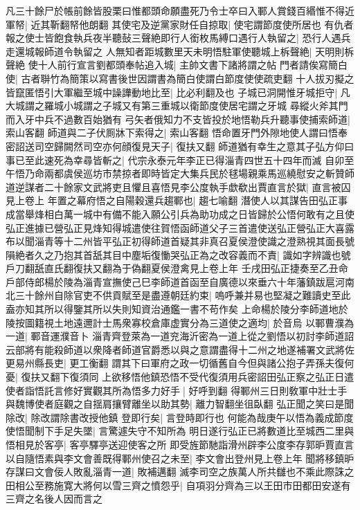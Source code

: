 凡三十餘尸於帳前餘皆股栗曰惟都頭命願盡死乃令士卒曰入鄆人賞錢百緡惟不得近軍帑|{
	近其靳翻帑他朗翻}
其使宅及逆黨家財任自掠取|{
	使宅謂節度使所居也}
有仇者報之使士皆飽食執兵夜半聽鼔三聲絶即行人銜枚馬縛口遇行人執留之|{
	恐行人遇兵走還城報師道令執留之}
人無知者距城數里天未明悟駐軍使聽城上柝聲絶|{
	天明則柝聲絶}
使十人前行宣言劉都頭奉帖追入城|{
	主帥文書下諸將謂之帖}
門者請俟寫簡白使|{
	古者聨竹為簡策以寫書後世因謂書為簡白使謂白節度使使疏吏翻}
十人拔刃擬之皆竄匿悟引大軍繼至城中譟譁動地比至|{
	比必利翻及也}
子城已洞開惟牙城拒守|{
	凡大城謂之羅城小城謂之子城又有第三重城以衛節度使居宅謂之牙城}
尋縱火斧其門而入牙中兵不過數百始猶有弓矢者俄知力不支皆投於地悟勒兵升聽事使捕索師道|{
	索山客翻}
師道與二子伏厠牀下索得之|{
	索山客翻}
悟命置牙門外隙地使人謂曰悟奉密詔送司空歸闕然司空亦何顔復見天子|{
	復扶又翻}
師道猶有幸生之意其子弘方仰曰事已至此速死為幸尋皆斬之|{
	代宗永泰元年李正已得淄青四世五十四年而滅}
自卯至午悟乃命兩都虞侯巡坊市禁掠者即時皆定大集兵民於毬場親乘馬巡繞慰安之斬贊師道逆謀者二十餘家文武將吏且懼且喜悟見李公度執手歔欷出賈直言於獄|{
	直言被囚見上卷上}
年置之幕府悟之自陽穀還兵趨鄆也|{
	趨七喻翻}
潛使人以其謀告田弘正事成當舉烽相白萬一城中有備不能入願公引兵為助功成之日皆歸於公悟何敢有之且使弘正進據已營弘正見烽知得城遣使往賀悟函師道父子三首遣使送弘正營弘正大喜露布以聞淄青等十二州皆平弘正初得師道首疑其非真召夏侯澄使識之澄熟視其面長號隕絶者久之乃抱其首舐其目中塵垢復慟哭弘正為之改容義而不責|{
	識如字辨識也號戶刀翻舐直氏翻復扶又翻為于偽翻夏侯澄禽見上卷上年}
壬戌田弘正捷奏至乙丑命戶部侍郎楊於陵為淄青宣撫使己巳李師道首函至自廣德以來垂六十年藩鎮跋扈河南北三十餘州自除官吏不供貢賦至是盡遵朝廷約束|{
	嗚呼兼并易也堅凝之難讀史至此盍亦知其所以得鑒其所以失則知資治通鑑一書不苟作矣}
上命楊於陵分李師道地於陵按圖籍視土地遠邇計士馬衆寡校倉庫虚實分為三道使之適均|{
	於音烏}
以鄆曹濮為一道|{
	鄆音運濮音卜}
淄青齊登萊為一道兖海沂密為一道上從之劉悟以初討李師道詔云部將有能殺師道以衆降者師道官爵悉以與之意謂盡得十二州之地遂補署文武將佐更易州縣長吏|{
	更工衡翻}
謂其下曰軍府之政一切循舊自今但與諸公抱子弄孫夫復何憂|{
	復扶又翻下復須同}
上欲移悟他鎮恐悟不受代復須用兵密詔田弘正察之弘正日遣使者詣悟託言修好實觀其所為悟多力好手|{
	好呼到翻}
得鄆州三日則敎軍中壯士手與魏博使者庭觀之自揺肩攘臂離坐以助其勢|{
	離力智翻坐徂臥翻}
弘正聞之笑曰是聞除改|{
	除改謂除書改授他鎮}
登即行矣|{
	言登時即行也}
何能為哉庚午以悟為義成節度使悟聞制下手足失墜|{
	言驚遽失守不知所為}
明日遂行弘正已將數道比至城西二里與悟相見於客亭|{
	客亭驛亭送迎使客之所}
即受旌節馳詣滑州辟李公度李存郭昈賈直言以自隨悟素與李文會善既得鄆州使召之未至|{
	李文會出登州見上卷上年}
聞將移鎮昈存謀曰文會佞人敗亂淄青一道|{
	敗補邁翻}
滅李司空之族萬人所共讎也不乘此際誅之田相公至務施寛大將何以雪三齊之憤怨乎|{
	自項羽分齊為三以王田市田都田安遂有三齊之名後人因而言之}
